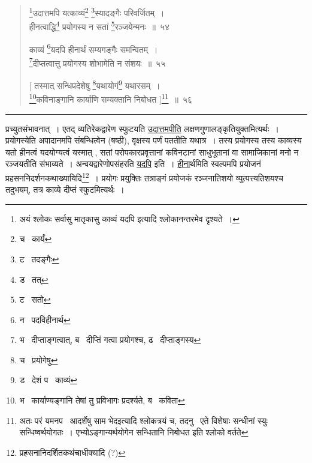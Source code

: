 \documentclass[11pt, openany]{book}
\begin{document}
\begin{quote}
{\na \renewcommand{\thefootnote}{1}\footnote{अयं श्लोकः सर्वासु मातृकासु {\qt काव्यं यदपि} इत्यादि श्लोकानन्तरमेव दृश्यते~।}उदात्तमपि यत्काव्यं\renewcommand{\thefootnote}{2}\footnote{च \textendash\ कार्यं} \renewcommand{\thefootnote}{3}\footnote{ट \textendash\ तदङ्गैः}स्यादङ्गैः परिवर्जितम्~।\\
हीनत्वाद्धि\renewcommand{\thefootnote}{4}\footnote{ड \textendash\ तत्} प्रयोगस्य न सतां \renewcommand{\thefootnote}{5}\footnote{ट \textendash\ सतो}रञ्जयेन्मनः~॥~५४

काव्यं \renewcommand{\thefootnote}{6}\footnote{न \textendash\ पदविहीनार्थ}यदपि हीनार्थं सम्यगङ्गैः समन्वितम्~।\\
\renewcommand{\thefootnote}{7}\footnote{भ \textendash\ दीप्ताङ्गत्वात्, ब \textendash\ दीप्तिं गत्वा प्रयोगश्च, ढ \textendash\ दीप्ताङ्गस्य}दीप्तत्वात्तु प्रयोगस्य शोभामेति न संशयः~॥~५५

[ तस्मात् सन्धिप्रदेशेषु \renewcommand{\thefootnote}{8}\footnote{च \textendash\ प्रयोगेषु}यथायोगं\renewcommand{\thefootnote}{9}\footnote{ड \textendash\ देशं प \textendash\ काव्यं} यथारसम्~।\\
\renewcommand{\thefootnote}{10}\footnote{भ \textendash\ कार्याण्यङ्गानि तेषां तु प्रविभागः प्रदर्श्यते, ब \textendash\ कविता}कविनाङ्गानि कार्याणि सम्यक्तानि निबोधत ]\renewcommand{\thefootnote}{11}\footnote{अतः परं यमनप \textendash\ आदर्शेषु {\qt साम भेद}इत्यादि श्लोकत्रयं च, तदनु \textendash\ एते विशेषाः सन्धीनां स्युः सन्धिष्वर्थयोगतः~। एभ्योऽङ्गान्यर्थयोगेन सन्धितानि निबोधत इति श्लोको वर्तते}~॥~५६}
\end{quote}

\hrule

\vspace{2mm}
\noindent
प्रच्युतसंभावनात्~। एतद् व्यतिरेकद्वारेण स्फुटयति \underline{उदात्तमपीति} लक्षणगुणालङ्कृतियुक्तमित्यर्थः~। प्रयोगस्येति अपादानमपि संबन्धित्वेन (षष्ठी), वृक्षस्य पर्णं पततीति यथात्र~। तस्य प्रयोगस्य तस्य काव्यस्य यतो हीनत्वं यदयोग्यत्वं यस्मात् , सतां परोपकारप्रवृत्तानां कविनटानां साधुभूतानां वा सामाजिकानां मनो न रञ्जयतीति संभाव्यते~। अन्वयद्वारेणोपसंहरति \underline{यदपि} इति~। \underline{हीना}र्थमिति स्वल्पमपि प्रयोजनं प्रहसननिदर्शनकथाख्यायिदि\renewcommand{\thefootnote}{*}\footnote{प्रहसनानिदर्शितकथंचाधीक्यादि (?)}~। प्रयोगः प्रयुक्तिः तत्राङ्गं प्रयोजकं रञ्जनातिशयो व्युत्पत्त्यतिशयश्च तदुभयम्, तत्र काव्ये दीप्तं स्फुटमित्यर्थः~।


\newpage
\lfoot{}
\end{document}

